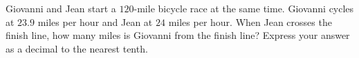 Giovanni and Jean start a $120$-mile bicycle race at the same time. Giovanni cycles at $23.9$ miles per hour and Jean at $24$ miles per hour. When Jean crosses the finish line, how many miles is Giovanni from the finish line? Express your answer as a decimal to the nearest tenth.
